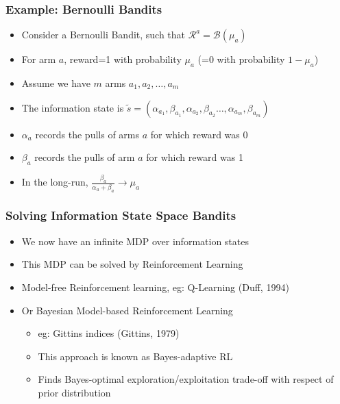 \documentclass[handout]{beamer}
\begin{document}
\begin{frame}
\frametitle{Example: Bernoulli Bandits}
\pause
\begin{itemize}[<+->]
\item Consider a Bernoulli Bandit, such that $\mathcal{R}^a = \mathcal{B}(\mu_a)$
\item For arm $a$, reward=1 with probability $\mu_a$ (=0 with probability $1-\mu_a$)
\item Assume we have $m$ arms $a_1, a_2, \ldots, a_m$
\item The information state is $\tilde{s} = (\alpha_{a_1}, \beta_{a_1}, \alpha_{a_2}, \beta_{a_2}\ldots, \alpha_{a_m}, \beta_{a_m})$
\item $\alpha_a$ records the pulls of arms $a$  for which reward was 0
\item $\beta_a$ records the pulls of arm $a$ for which reward was 1
\item In the long-run, $\frac {\beta_a} {\alpha_a + \beta_a} \rightarrow \mu_a$
\end{itemize}
\end{frame}

\begin{frame}
\frametitle{Solving Information State Space Bandits}
\pause
\begin{itemize}[<+->]
\item We now have an infinite MDP over information states
\item This MDP can be solved by Reinforcement Learning
\item Model-free Reinforcement learning, eg: Q-Learning (Duff, 1994)
\item Or Bayesian Model-based Reinforcement Learning
\begin{itemize}
\item eg: Gittins indices (Gittins, 1979)
\item This approach is known as Bayes-adaptive RL
\item Finds Bayes-optimal exploration/exploitation trade-off with respect of prior distribution
\end{itemize}
\end{itemize}
\end{frame}
\end{document}
